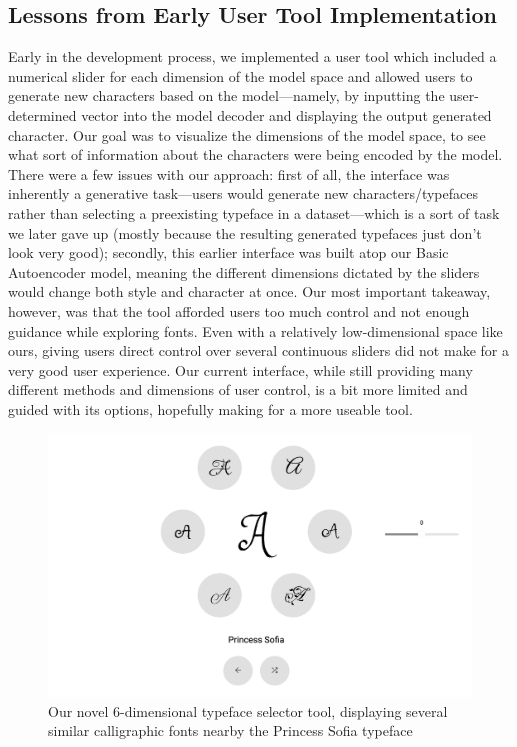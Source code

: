 \subsection{Lessons from Early User Tool Implementation}

Early in the development process, we implemented a user tool which included a numerical slider for each dimension of the model space and allowed users to generate new characters based on the model---namely, by inputting the user-determined vector into the model decoder and displaying the output generated character. Our goal was to visualize the dimensions of the model space, to see what sort of information about the characters were being encoded by the model. There were a few issues with our approach: first of all, the interface was inherently a generative task---users would generate new characters/typefaces rather than selecting a preexisting typeface in a dataset---which is a sort of task we later gave up (mostly because the resulting generated typefaces just don't look very good); secondly, this earlier interface was built atop our Basic Autoencoder model, meaning the different dimensions dictated by the sliders would change both style and character at once. Our most important takeaway, however, was that the tool afforded users too much control and not enough guidance while exploring fonts. Even with a relatively low-dimensional space like ours, giving users direct control over several continuous sliders did not make for a very good user experience. Our current interface, while still providing many different methods and dimensions of user control, is a bit more limited and guided with its options, hopefully making for a more useable tool.

\begin{figure}[]
    \centering
    \includegraphics[width=\textwidth]{images/selector-tool.png}
    \caption{Our novel 6-dimensional typeface selector tool, displaying several similar calligraphic fonts nearby the Princess Sofia typeface}
    \label{fig:selector-tool}
\end{figure}

